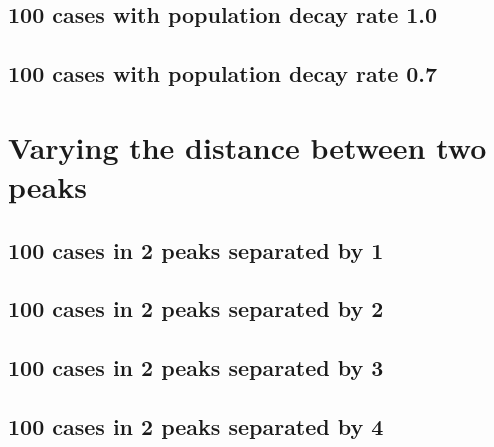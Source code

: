 \subsection{100 cases with population decay rate 1.0}


\subsection{100 cases with population decay rate 0.7}


\section{Varying the distance between two peaks}

\subsection{100 cases in 2 peaks separated by 1}


\subsection{100 cases in 2 peaks separated by 2}


\subsection{100 cases in 2 peaks separated by 3}


\subsection{100 cases in 2 peaks separated by 4}



